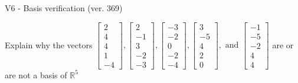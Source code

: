 \begin{exercise}
  \begin{exerciseTitle}V6 - Basis verification (ver. 369)\end{exerciseTitle}
  \begin{exerciseStatement}
    Explain why the vectors \(\left[\begin{array}{r}
2 \\
4 \\
4 \\
1 \\
-4
\end{array}\right] , \left[\begin{array}{r}
2 \\
-1 \\
3 \\
-2 \\
-3
\end{array}\right] , \left[\begin{array}{r}
-3 \\
-2 \\
0 \\
-2 \\
-4
\end{array}\right] , \left[\begin{array}{r}
3 \\
-5 \\
4 \\
2 \\
0
\end{array}\right] , \text{ and } \left[\begin{array}{r}
-1 \\
-5 \\
-2 \\
4 \\
4
\end{array}\right]\) are or are not a basis of \(\mathbb{R}^5\)	



\end{exerciseStatement}
\end{exercise}
